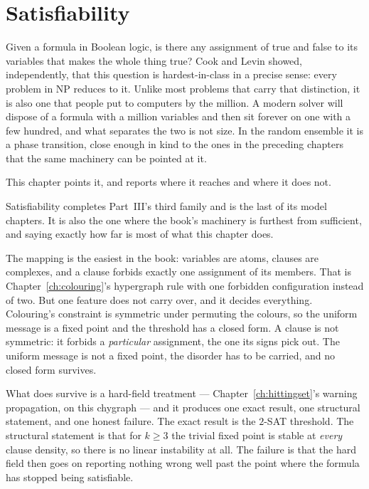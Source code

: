 \chapter{Satisfiability}
\label{ch:satisfiability}

Given a formula in Boolean logic, is there any assignment of true and false to
its variables that makes the whole thing true? Cook and Levin showed,
independently, that this question is hardest-in-class in a precise sense: every
problem in NP reduces to it. Unlike most problems that carry that distinction,
it is also one that people put to computers by the million. A modern solver will
dispose of a formula with a million variables and then sit forever on one with a
few hundred, and what separates the two is not size. In the random ensemble it
is a phase transition, close enough in kind to the ones in the preceding
chapters that the same machinery can be pointed at it.

This chapter points it, and reports where it reaches and where it does not.

Satisfiability completes Part~III's third family and is the last of its model
chapters. It is also the one where the book's machinery is furthest from
sufficient, and saying exactly how far is most of what this chapter does.

The mapping is the easiest in the book: variables are atoms, clauses are
complexes, and a clause forbids exactly one assignment of its members. That is
Chapter~\ref{ch:colouring}'s hypergraph rule with one forbidden configuration
instead of two. But one feature does not carry over, and it decides everything.
Colouring's constraint is symmetric under permuting the colours, so the uniform
message is a fixed point and the threshold has a closed form.
A clause is not symmetric: it forbids a \emph{particular} assignment, the one
its signs pick out. The uniform message is not a fixed point, the disorder has
to be carried, and no closed form survives.

What does survive is a hard-field treatment --- Chapter~\ref{ch:hittingset}'s
warning propagation, on this chygraph --- and it produces one exact result, one
structural statement, and one honest failure. The exact result is the $2$-SAT
threshold. The structural statement is that for $k\ge3$ the trivial fixed point
is stable at \emph{every} clause density, so there is no linear instability at
all. The failure is that the hard field then goes on reporting nothing wrong
well past the point where the formula has stopped being satisfiable.

